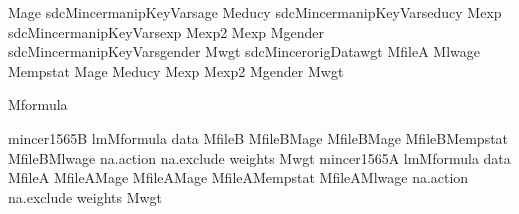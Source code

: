 \documentclass[letterpaper,10pt,english]{sphinxmanual}
\begin{document}
\begin{sphinxVerbatim}[commandchars=\\\{\},numbers=left,firstnumber=1,stepnumber=1]
Mage       sdcMincermanipKeyVarsage    
Meducy     sdcMincermanipKeyVarseducy  
Mexp       sdcMincermanipKeyVarsexp    
Mexp2      Mexp                        
Mgender    sdcMincermanipKeyVarsgender 
Mwgt       sdcMincerorigDatawgt        
MfileA     Mlwage Mempstat Mage Meducy Mexp Mexp2 Mgender Mwgt

Mformula  

mincer1565B  lmMformula data  MfileB
MfileBMage    MfileBMage    MfileBMempstat 
MfileBMlwage   na.action  na.exclude weights  Mwgt 
mincer1565A  lmMformula data  MfileA
                               MfileAMage    MfileAMage    MfileAMempstat 
               MfileAMlwage   na.action  na.exclude weights  Mwgt 


\end{sphinxVerbatim}
\end{document}

